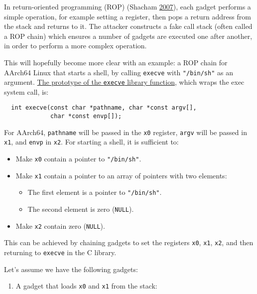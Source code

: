 \documentclass[a4paper,]{report}
\providecommand{\tightlist}{%
  \setlength{\itemsep}{0pt}\setlength{\parskip}{0pt}}
\begin{document}
In return-oriented programming
(ROP) (Shacham
\protect\hyperlink{ref-Shacham2007}{2007}), each gadget performs a
simple operation, for example setting a register, then pops a return
address from the stack and returns to it. The attacker constructs a fake
call stack (often called a ROP chain) which ensures a number of gadgets are executed one after
another, in order to perform a more complex operation.

This will hopefully become more clear with an example: a ROP chain for
AArch64 Linux that starts a shell, by calling \texttt{execve} with
\texttt{"/bin/sh"} as an argument.
\href{https://man7.org/linux/man-pages/man2/execve.2.html}{The prototype
of the \texttt{execve} library function}, which wraps the exec system
call, is:

\begin{verbatim}
  int execve(const char *pathname, char *const argv[],
             char *const envp[]);
\end{verbatim}

For AArch64, \texttt{pathname} will be passed in the \texttt{x0}
register, \texttt{argv} will be passed in \texttt{x1}, and \texttt{envp}
in \texttt{x2}. For starting a shell, it is sufficient to:

\begin{itemize}
\tightlist
\item
  Make \texttt{x0} contain a pointer to \texttt{"/bin/sh"}.
\item
  Make \texttt{x1} contain a pointer to an array of pointers with two
  elements:

  \begin{itemize}
  \tightlist
  \item
    The first element is a pointer to \texttt{"/bin/sh"}.
  \item
    The second element is zero (\texttt{NULL}).
  \end{itemize}
\item
  Make \texttt{x2} contain zero (\texttt{NULL}).
\end{itemize}

This can be achieved by chaining gadgets to set the registers
\texttt{x0}, \texttt{x1}, \texttt{x2}, and then returning to
\texttt{execve} in the C library.

Let's assume we have the following gadgets:

\begin{enumerate}
\def\labelenumi{\arabic{enumi}.}
\tightlist
\item
  A gadget that loads \texttt{x0} and \texttt{x1} from the stack:
\end{enumerate}
\end{document}
